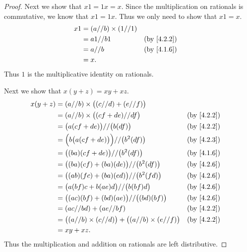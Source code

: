 \begin{proof}
  Next we show that \(x1 = 1x = x\).
  Since the multiplication on rationals is commutative, we know that \(x1 = 1x\).
  Thus we only need to show that \(x1 = x\).
  \begin{align*}
    x1 & = (a // b) \times (1 // 1)                 \\
       & = a1 // b1                 &  & \by{4.2.2} \\
       & = a // b                   &  & \by{4.1.6} \\
       & = x.
  \end{align*}
  Thus \(1\) is the multiplicative identity on rationals.

  Next we show that \(x(y + z) = xy + xz\).
  \begin{align*}
    x(y + z) & = (a // b) \times \big((c // d) + (e // f)\big)                                           \\
             & = (a // b) \times \big((cf + de) // df\big)                               &  & \by{4.2.2} \\
             & = \big(a(cf + de)\big) // \big(b(df)\big)                                 &  & \by{4.2.2} \\
             & = \Big(b\big(a(cf + de)\big)\Big) // \big(b^2(df)\big)                    &  & \by{4.2.3} \\
             & = \big((ba)(cf + de)\big) // \big(b^2(df)\big)                            &  & \by{4.1.6} \\
             & = \big((ba)(cf) + (ba)(de)\big) // \big(b^2(df)\big)                      &  & \by{4.2.6} \\
             & = \big((ab)(fc) + (ba)(ed)\big) // \big(b^2(fd)\big)                      &  & \by{4.2.6} \\
             & = \big(a(bf)c + b(ae)d\big) // \big(b(bf)d\big)                           &  & \by{4.2.6} \\
             & = \big((ac)(bf) + (bd)(ae)\big) // \big((bd)(bf)\big)                     &  & \by{4.2.6} \\
             & = (ac // bd) + (ae // bf)                                                 &  & \by{4.2.2} \\
             & = \big((a // b) \times (c // d)\big) + \big((a // b) \times (e // f)\big) &  & \by{4.2.2} \\
             & = xy + xz.
  \end{align*}
  Thus the multiplication and addition on rationals are left distributive.


\end{proof}
